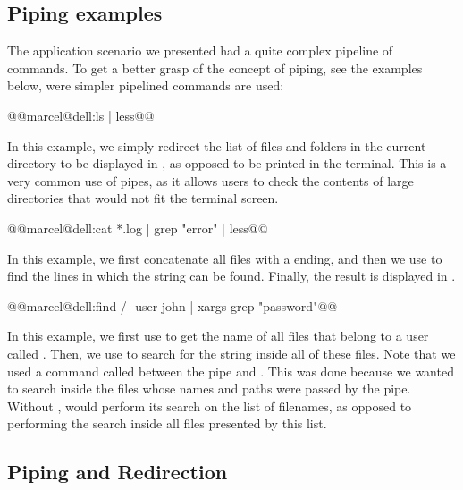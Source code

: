 \subsection{Piping examples}

The application scenario we presented had a quite complex pipeline of commands. To get a better grasp of the concept of piping, see the examples below, were simpler pipelined commands are used:

\begin{command_line}[make]
@@marcel@dell:ls | less@@
\end{command_line}
In this example, we simply redirect the list of files and folders in the current directory to be displayed in , as opposed to be printed in the terminal. This is a very common use of pipes, as it allows users to check the contents of large directories that would not fit the terminal screen.

\begin{command_line}[make]
@@marcel@dell:cat *.log | grep "error" | less@@
\end{command_line}
In this example, we first concatenate all files with a  ending, and then we use  to find the lines in which the string  can be found. Finally, the result is displayed in .

\begin{command_line}[make]
@@marcel@dell:find /  -user john | xargs grep "password"@@
\end{command_line}
In this example, we first use  to get the name of all files that belong to a user called . Then, we use  to search for the string  inside all of these files. Note that we used a command called  between the pipe and . This was done because we wanted  to search inside the files whose names and paths were passed by the pipe. Without ,  would perform its search on the list of filenames, as opposed to performing the search inside all files presented by this list.

\subsection{Piping and Redirection}

